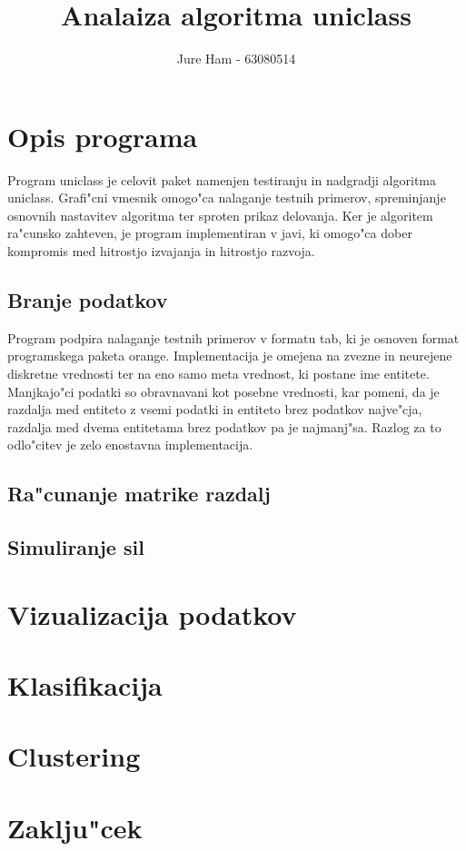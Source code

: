 \documentclass[slovene,11pt]{article}
\title{Analaiza algoritma uniclass}
\author{Jure Ham - 63080514}
\begin{document}
\tableofcontents
\pagebreak

\section{Opis programa}
	Program uniclass je celovit paket namenjen testiranju in nadgradji algoritma uniclass. Grafi"cni vmesnik omogo"ca nalaganje testnih primerov, spreminjanje osnovnih nastavitev algoritma ter sproten prikaz delovanja. Ker je algoritem ra"cunsko zahteven, je program implementiran v javi, ki omogo"ca dober kompromis med hitrostjo izvajanja in hitrostjo razvoja.

	\subsection{Branje podatkov}
		Program podpira nalaganje testnih primerov v formatu tab, ki je osnoven format programskega paketa orange. Implementacija je omejena na zvezne in neurejene diskretne vrednosti ter na eno samo meta vrednost, ki postane ime entitete. \\
		Manjkajo"ci podatki so obravnavani kot posebne vrednosti, kar pomeni, da je razdalja med entiteto z vsemi podatki in entiteto brez podatkov najve"cja, razdalja med dvema entitetama brez podatkov pa je najmanj"sa. Razlog za to odlo"citev je zelo enostavna implementacija.
	
	\subsection{Ra"cunanje matrike razdalj}
	\subsection{Simuliranje sil}
	
\section{Vizualizacija podatkov}

\section{Klasifikacija}

\section{Clustering}

\section{Zaklju"cek}
	
\end{document}
